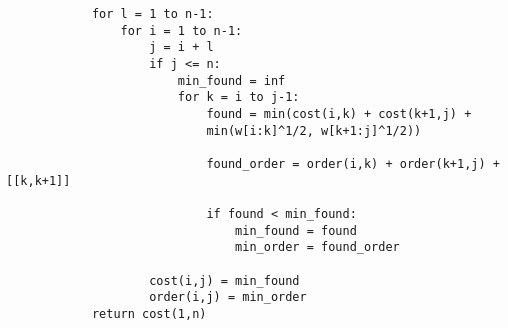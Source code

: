 \documentclass[12pt]{article}
\begin{document}
\begin{enumerate}
\begin{verbatim}
            for l = 1 to n-1:
                for i = 1 to n-1:
                    j = i + l
                    if j <= n:
                        min_found = inf
                        for k = i to j-1:
                            found = min(cost(i,k) + cost(k+1,j) + 
                            min(w[i:k]^1/2, w[k+1:j]^1/2))

                            found_order = order(i,k) + order(k+1,j) + [[k,k+1]]

                            if found < min_found:
                                min_found = found
                                min_order = found_order

                    cost(i,j) = min_found
                    order(i,j) = min_order
            return cost(1,n)
    \end{verbatim}

 \end{enumerate}
\end{document}
